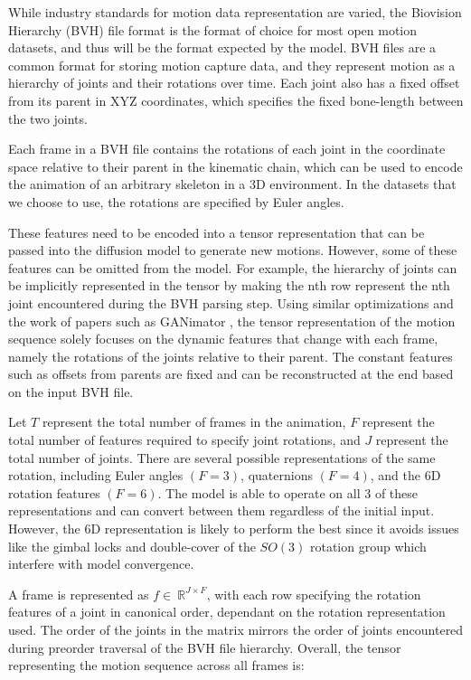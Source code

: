 \documentclass[a4paper, 12pt]{report}
\begin{document}
While industry standards for motion data representation are varied, the Biovision Hierarchy (BVH) file format is the format of choice for most open motion datasets, and thus will be the format expected by the model. BVH files are a common format for storing motion capture data, and they represent motion as a hierarchy of joints and their rotations over time. Each joint also has a fixed offset from its parent in XYZ coordinates, which specifies the fixed bone-length between the two joints. 

Each frame in a BVH file contains the rotations of each joint in the coordinate space relative to their parent in the kinematic chain, which can be used to encode the animation of an arbitrary skeleton in a 3D environment. In the datasets that we choose to use, the rotations are specified by Euler angles.

These features need to be encoded into a tensor representation that can be passed into the diffusion model to generate new motions. However, some of these features can be omitted from the model. For example, the hierarchy of joints can be implicitly represented in the tensor by making the nth row represent the nth joint encountered during the BVH parsing step. Using similar optimizations and the work of papers such as GANimator \cite{li_ganimator_2022}, the tensor representation of the motion sequence solely focuses on the dynamic features that change with each frame, namely the rotations of the joints relative to their parent. The constant features such as offsets from parents are fixed and can be reconstructed at the end based on the input BVH file. 

Let \(T\) represent the total number of frames in the animation, \(F\) represent the total number of features required to specify joint rotations, and \(J\) represent the total number of joints. There are several possible representations of the same rotation, including Euler angles \((F=3)\), quaternions \((F=4)\), and the 6D \cite{zhou_continuity_2020} rotation features \((F=6)\). The model is able to operate on all 3 of these representations and can convert between them regardless of the initial input. However, the 6D representation is likely to perform the best since it avoids issues like the gimbal locks and double-cover of the \(SO(3)\) rotation group which interfere with model convergence. 

A frame is represented as \(f \in\ \mathbb{R}^{J \times F}\), with each row specifying the rotation features of a joint in canonical order, dependant on the rotation representation used. The order of the joints in the matrix mirrors the order of joints encountered during preorder traversal of the BVH file hierarchy. Overall, the tensor representing the motion sequence across all frames is:
\end{document}
